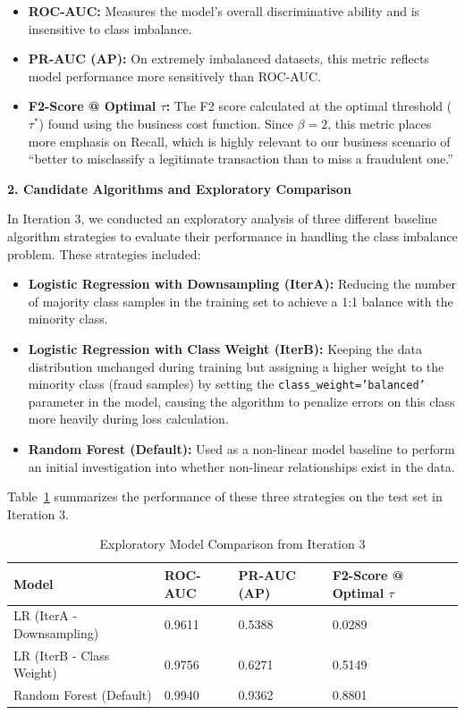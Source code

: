 \documentclass[sigplan,screen]{acmart}
\begin{document}
\begin{itemize}
\item \textbf{ROC-AUC:} Measures the model's overall discriminative ability and is insensitive to class imbalance.
\item \textbf{PR-AUC (AP):} On extremely imbalanced datasets, this metric reflects model performance more sensitively than ROC-AUC.
\item \textbf{F2-Score @ Optimal $\tau$:} The F2 score calculated at the optimal threshold ($\tau^*$) found using the business cost function. Since $\beta=2$, this metric places more emphasis on Recall, which is highly relevant to our business scenario of ``better to misclassify a legitimate transaction than to miss a fraudulent one.''
\end{itemize}

\textbf{2. Candidate Algorithms and Exploratory Comparison}

In Iteration 3, we conducted an exploratory analysis of three different baseline algorithm strategies to evaluate their performance in handling the class imbalance problem. These strategies included:

\begin{itemize}
\item \textbf{Logistic Regression with Downsampling (IterA):} Reducing the number of majority class samples in the training set to achieve a 1:1 balance with the minority class.
\item \textbf{Logistic Regression with Class Weight (IterB):} Keeping the data distribution unchanged during training but assigning a higher weight to the minority class (fraud samples) by setting the \texttt{class\_weight='balanced'} parameter in the model, causing the algorithm to penalize errors on this class more heavily during loss calculation.
\item \textbf{Random Forest (Default):} Used as a non-linear model baseline to perform an initial investigation into whether non-linear relationships exist in the data.
\end{itemize}

Table~\ref{tab:iter3-comparison} summarizes the performance of these three strategies on the test set in Iteration 3.

\begin{table}[h]
\centering
\caption{Exploratory Model Comparison from Iteration 3}
\label{tab:iter3-comparison}
\begin{tabular}{|p{5cm}|p{2cm}|p{2.5cm}|p{2.8cm}|}
\hline
\textbf{Model} & \textbf{ROC-AUC} & \textbf{PR-AUC (AP)} & \textbf{F2-Score @ Optimal $\tau$} \\
\hline
LR (IterA - Down\-sampling) & 0.9611 & 0.5388 & 0.0289 \\
\hline
LR (IterB - Class Weight) & 0.9756 & 0.6271 & 0.5149 \\
\hline
Random Forest (Default) & 0.9940 & 0.9362 & 0.8801 \\
\hline
\end{tabular}
\end{table}
\end{document}
